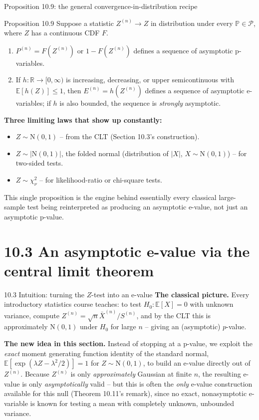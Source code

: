 \documentclass[aspectratio=169,10pt]{beamer}
\newcommand{\R}{\mathbb{R}}
\newcommand{\E}{\mathbb{E}}
\newcommand{\Pb}{\mathbb{P}}
\newcommand{\calP}{\mathcal{P}}
\begin{document}
\begin{frame}{Proposition 10.9: the general convergence-in-distribution recipe}
  \begin{block}{Proposition 10.9}
    Suppose a statistic $Z^{(n)} \to Z$ in distribution under every $\Pb\in\calP$, where $Z$ has a continuous CDF $F$.
    \begin{enumerate}
      \item $P^{(n)} = F(Z^{(n)})$ or $1-F(Z^{(n)})$ defines a sequence of asymptotic p-variables.
      \item If $h:\R\to[0,\infty)$ is increasing, decreasing, or upper semicontinuous with $\E[h(Z)]\leq1$, then $E^{(n)}=h(Z^{(n)})$ defines a sequence of asymptotic e-variables; if $h$ is also bounded, the sequence is \emph{strongly} asymptotic.
    \end{enumerate}
  \end{block}
  \textbf{Three limiting laws that show up constantly:}
  \begin{itemize}
    \item $Z\sim\mathrm{N}(0,1)$ -- from the CLT (Section 10.3's construction).
    \item $Z\sim|\mathrm{N}(0,1)|$, the folded normal (distribution of $|X|$, $X\sim\mathrm{N}(0,1)$) -- for two-sided tests.
    \item $Z\sim\chi^2_\nu$ -- for likelihood-ratio or chi-square tests.
  \end{itemize}
  This single proposition is the engine behind essentially every classical large-sample test being reinterpreted as producing an asymptotic e-value, not just an asymptotic p-value.
\end{frame}

\section{10.3 An asymptotic e-value via the central limit theorem}

\begin{frame}{10.3 Intuition: turning the $Z$-test into an e-value}
  \textbf{The classical picture.} Every introductory statistics course teaches: to test $H_0: \E[X]=0$ with unknown variance, compute $Z^{(n)} = \sqrt n \bar X^{(n)}/S^{(n)}$, and by the CLT this is approximately $\mathrm{N}(0,1)$ under $H_0$ for large $n$ -- giving an (asymptotic) $p$-value.

  \vspace{0.2cm}
  \textbf{The new idea in this section.} Instead of stopping at a p-value, we exploit the \emph{exact} moment generating function identity of the standard normal, $\E[\exp(\lambda Z - \lambda^2/2)] = 1$ for $Z\sim\mathrm{N}(0,1)$, to build an e-value directly out of $Z^{(n)}$. Because $Z^{(n)}$ is only \emph{approximately} Gaussian at finite $n$, the resulting e-value is only \emph{asymptotically} valid -- but this is often the \emph{only} e-value construction available for this null (Theorem 10.11's remark), since no exact, nonasymptotic e-variable is known for testing a mean with completely unknown, unbounded variance.
\end{frame}
\end{document}
